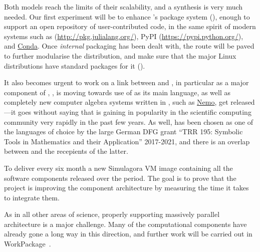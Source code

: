 \begin{workpackage}[id=component-architecture,wphases=0-48!.5,
  title=Component Architecture,lead=UV,
  PSRM=46,UVRM=8,SARM=16, USORM=6, UORM=19, LLRM=14, UJFRM=6, UGRM=14]
\begin{tasklist}
\begin{task}[title=Modularisation and packaging,id=mod-packaging,lead=UV,PM=28,partners={PS,LL,UG,UO},wphases=0-48,issue=52]
    Both models reach the limits of their scalability, and a synthesis
    is very much needed.  Our first experiment will be to enhance
    \Sage's package system
    (), enough to
    support an open repository of user-contributed code, in the same
    spirit of modern systems such as \Julia
    (\url{http://pkg.julialang.org/}),  PyPI
    (\url{https://pypi.python.org/}), and \href{https://conda.io/docs/}{Conda}.
    Once \emph{internal} packaging
    has been dealt with, the route will be paved to further modularise
    the \Sage distribution, and make sure that the major Linux
    distributions have standard packages for it
    ().
    
    It also becomes urgent to work on a link between \Julia and \Sage,
    in particular as a major component of \Sage, \Singular, is moving towards
    use of \Julia as its main language, as well as completely new computer
    algebra systems written in \Julia, such as \href{http://nemocas.org/}{Nemo},
    get released---it goes without saying that \Julia is gaining in popularity in the
    scientific computing community very rapidly in the past few years.
    As well, \Julia has been chosen as one of
    the languages of choice by the large German DFG grant ``TRR 195:
    Symbolic Tools in Mathematics and their Application'' 2017-2021, and there
    is an overlap between \ODK and the recepients of the latter.

  \end{task}

\begin{task}[id=simulagora-dev,title=Simulagora integration,PM=4,lead=LL,wphases=0-48,issue=53]
  To deliver every six month a new Simulagora VM image containing all the software
  components released over the period. The goal is to prove that the project is
  improving the component architecture by measuring the time it takes to
  integrate them.
\end{task}


  \begin{task}[title=Component architecture for High Performance Computing and Parallelism,id=component-for-HPC,PM=12,wphases=36-48,lead=UJF,partners=SA,issue=54]
    As in all other areas of science, properly supporting massively
    parallel architecture is a major challenge. Many of the
    computational components have already gone a long way in this
    direction, and further work will be carried out in
    WorkPackage~.


\end{task}
\end{tasklist}
\end{workpackage}
